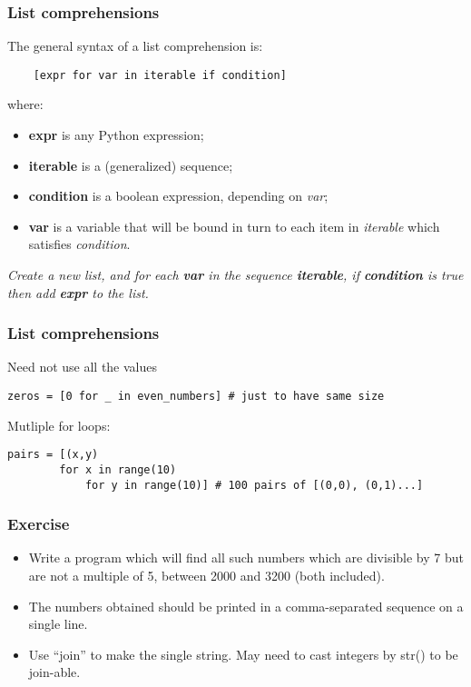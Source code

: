 \begin{frame}[fragile]\frametitle{List comprehensions}
  \def\e{\ttfamily\itshape}

  The general syntax of a list comprehension is:
  \begin{lstlisting}
    [expr for var in iterable if condition]
  \end{lstlisting}
  where:
  \begin{itemize}
  \item{\bf expr} is any Python expression;
  \item{\bf iterable} is a (generalized) sequence;
  \item {\bf condition} is a boolean expression, depending on
    {\e var};
  \item {\bf var} is a variable that will be bound in turn to each item
    in {\e iterable} which satisfies {\e condition}.
  \end{itemize}

   \textit{Create a new list, and for each \textbf{var} in the
    sequence \textbf{iterable}, if \textbf{condition} is true then add
    \textbf{expr} to the list.}
\end{frame}

\begin{frame}[fragile]\frametitle{List comprehensions}
Need not use all the values
  \begin{lstlisting}
zeros = [0 for _ in even_numbers] # just to have same size
  \end{lstlisting}
Mutliple for loops:
  \begin{lstlisting}
pairs = [(x,y)
		for x in range(10)
			for y in range(10)] # 100 pairs of [(0,0), (0,1)...]
  \end{lstlisting}
\end{frame}

\begin{frame}[fragile]\frametitle{Exercise}
  \begin{itemize}
  \item Write a program which will find all such numbers which are divisible by 7 but are not a multiple of 5,
between 2000 and 3200 (both included).
  \item The numbers obtained should be printed in a comma-separated sequence on a single line.
  \item Use ``join'' to make the single string. May need to cast integers by str() to be join-able.
  \end{itemize}  
\end{frame}

